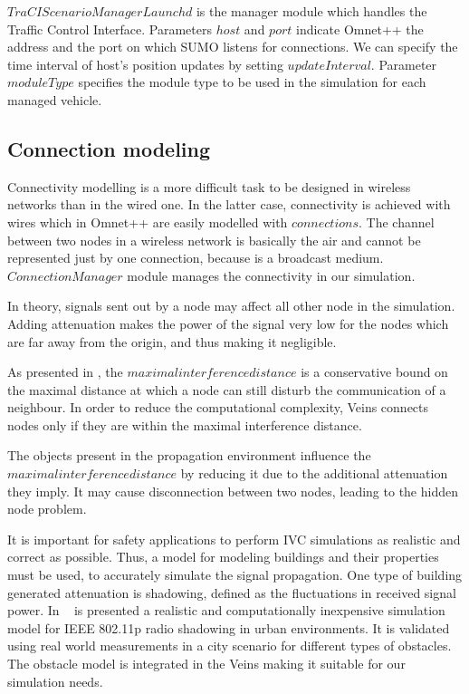 $TraCIScenarioManagerLaunchd$ is the manager module which handles the Traffic
Control Interface. Parameters $host$ and $port$ indicate Omnet++ the address and
the port on which SUMO listens for connections. We can specify the time interval
of host's position updates by setting $updateInterval$. Parameter $moduleType$
specifies the module type to be used in the simulation for each managed vehicle.

\subsection{Connection modeling}

Connectivity modelling is a more difficult task to be designed in wireless
networks than in the wired one. In the latter case, connectivity is achieved with wires
which in Omnet++ are easily modelled with $connections$. The channel between two
nodes in a wireless network is basically the air and cannot be represented just
by one connection, because is a broadcast medium. $ConnectionManager$ module
manages the connectivity in our simulation.

In theory, signals sent out by a node may affect all other node in the
simulation. Adding attenuation makes the power of the signal very low for the
nodes which are far away from the origin, and thus making it negligible.

As presented in \cite{Kopke}, the $maximal interference distance$ is a
conservative bound on the maximal distance at which a node can still disturb the
communication of a neighbour. In order to reduce the computational complexity,
Veins connects nodes only if they are within the maximal interference distance.

The objects present in the propagation environment influence the $maximal
interference distance$ by reducing it due to the additional attenuation they
imply. It may cause disconnection between two nodes, leading to the hidden node
problem.

It is important for safety applications to perform IVC simulations as realistic
and correct as possible. Thus, a model for modeling buildings and their
properties must be used, to accurately simulate the signal propagation. One
type of building generated attenuation is shadowing, defined as the fluctuations
in received signal power. In ~\cite{sommer2011computationally} is presented a
realistic and computationally inexpensive simulation model for IEEE 802.11p
radio shadowing in urban environments. It is validated using real world
measurements in a city scenario for different types of obstacles. The obstacle
model is integrated in the Veins making it suitable for our simulation needs.

